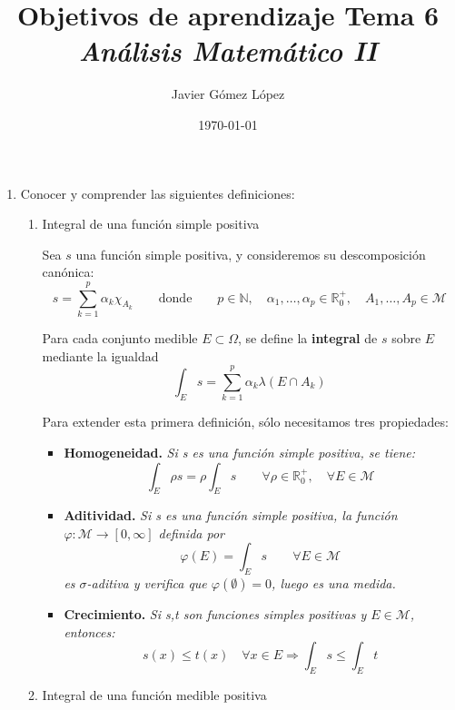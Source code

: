 \documentclass[a4paper, 12pt]{article}
\title{\textbf{Objetivos de aprendizaje Tema 6} \\ \textit{Análisis Matemático II}}
\author{Javier Gómez López}
\date{\today}
\begin{document}
\maketitle

\begin{enumerate}[label=\textbf{\arabic*}.]

\item Conocer y comprender las siguientes definiciones:

\begin{enumerate}[label=\textit{\alph*)}]
	\item Integral de una función simple positiva
	
	Sea \(s\) una función simple positiva, y consideremos su descomposición canónica:
	\begin{equation}\label{uno}
	s = \sum_{k=1}^{p} \alpha_k \chi_{A_k} \qquad \text{donde} \qquad p \in \mathbb{N}, \quad \alpha_1, \dotsc, \alpha_p \in \mathbb{R}_0^+, \quad A_1, \dotsc, A_p \in \mathcal{M}
	\end{equation}
	
	Para cada conjunto medible \(E \subset \Omega\), se define la \textbf{integral} de \(s\) sobre \(E\) mediante la igualdad
	\[
		\int_{E} s = \sum_{k=1}^{p} \alpha_k \lambda (E \cap A_k) 
	\]
	
	Para extender esta primera definición, sólo necesitamos tres propiedades:
	\begin{itemize}
		\item \textbf{Homogeneidad.} \textit{Si s es una función simple positiva, se tiene:}
		\[
			\int_E \rho s = \rho \int_E s \qquad \forall \rho \in \mathbb{R}_0^+, \quad \forall E \in \mathcal{M}
		\]
		
		\item \textbf{Aditividad.} \textit{Si s es una función simple positiva, la función \(\varphi: \mathcal{M} \to [0,\infty ] \) definida por}
		\[
			\varphi (E) = \int_E s \qquad \forall E \in \mathcal{M}
		\]
		\textit{es \(\sigma\)-aditiva y verifica que \(\varphi (\emptyset) = 0\), luego es una medida.}
		
		\item \textbf{Crecimiento.} \textit{Si s,t son funciones simples positivas y \(E \in \mathcal{M}\), entonces:}
		\[
			s(x) \leq t(x) \quad \forall x \in E \Rightarrow \int_E s \leq \int_E t
		\]
	\end{itemize}
	
	\medskip
	
	\item Integral de una función medible positiva
	

\end{enumerate}
\end{enumerate}
\end{document}
